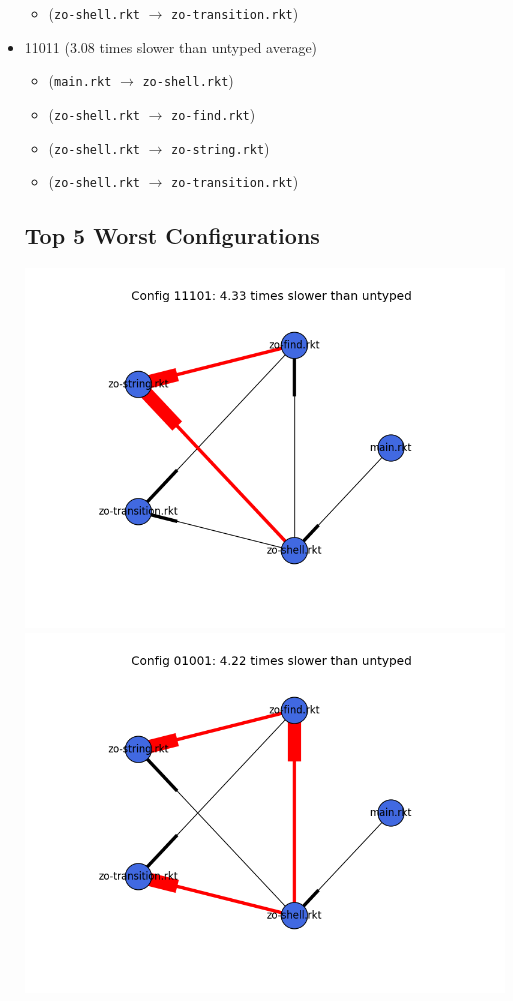\documentclass{article}
\newcommand{\mono}[1]{\texttt{#1}}
\begin{document}
\begin{itemize}
\begin{itemize}
  \item (\mono{zo-shell.rkt} $\rightarrow$ \mono{zo-transition.rkt})
  \end{itemize}
\item 11011 (3.08 times slower than untyped average)
  \begin{itemize}
  \item (\mono{main.rkt} $\rightarrow$ \mono{zo-shell.rkt})
  \item (\mono{zo-shell.rkt} $\rightarrow$ \mono{zo-find.rkt})
  \item (\mono{zo-shell.rkt} $\rightarrow$ \mono{zo-string.rkt})
  \item (\mono{zo-shell.rkt} $\rightarrow$ \mono{zo-transition.rkt})
  \end{itemize}

\subsection{Top 5 Worst Configurations}
\includegraphics[width=\textwidth]{zordoz-2015-04-09-module-graph-11101.png}
\includegraphics[width=\textwidth]{zordoz-2015-04-09-module-graph-01001.png}

\end{itemize}
\end{document}
